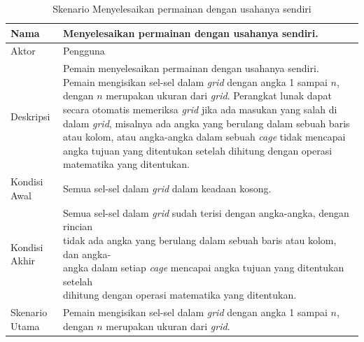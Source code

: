 \begin{enumerate}
\begin{table}
\centering
\captionsetup{justification=centering}
\begin{tabular}{| l || l |}
\hline
Nama & Menyelesaikan permainan dengan usahanya sendiri. \\
\hline
Aktor & Pengguna \\
\hline
Deskripsi & \makecell[l]{Pemain menyelesaikan permainan dengan usahanya sendiri. Pemain \\ mengisikan sel-sel dalam \textit{grid} dengan angka 1 sampai \begin{math}n\end{math}, dengan \begin{math}n\end{math} \\ merupakan ukuran dari \textit{grid}. Perangkat lunak dapat secara otomatis \\ memeriksa \textit{grid} jika ada masukan yang salah di dalam \textit{grid}, misalnya ada \\ angka yang berulang dalam sebuah baris atau kolom, atau angka-angka \\ dalam sebuah \textit{cage} tidak mencapai angka tujuan yang ditentukan setelah \\ dihitung dengan operasi matematika yang ditentukan.} \\
\hline
Kondisi Awal & Semua sel-sel dalam \textit{grid} dalam keadaan kosong. \\
\hline
Kondisi Akhir & \makecell[l]{Semua sel-sel dalam \textit{grid} sudah terisi dengan angka-angka, dengan rincian \\ tidak ada angka yang berulang dalam sebuah baris atau kolom, dan angka- \\ angka dalam setiap \textit{cage} mencapai angka tujuan yang ditentukan setelah \\ dihitung dengan operasi matematika yang ditentukan.} \\
\hline
Skenario Utama & \makecell[l]{Pemain mengisikan sel-sel dalam \textit{grid} dengan angka 1 sampai \begin{math}n\end{math}, dengan \begin{math}n\end{math} \\ merupakan ukuran dari \textit{grid}.} \\
\hline
\end{tabular}
\caption[Skenario menyelesaikan permainan dengan usahanya sendiri]{Skenario Menyelesaikan permainan dengan usahanya sendiri}
\label{tab:analisisplay}
\end{table}

\end{enumerate}

